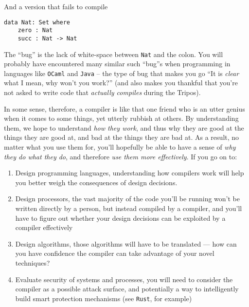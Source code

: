 And   a version that fails to compile 

\begin{code}
\label{code:agda-nat-bad}
\begin{verbatim}
data Nat: Set where
    zero : Nat
    succ : Nat -> Nat
\end{verbatim}
\end{code}

The ``bug'' is the lack of white-space between \texttt{Nat} and the colon. You will probably have encountered many similar such ``bug''s when programming in languages like \texttt{OCaml} and \texttt{Java} -- the type of bug that makes you go ``It is \emph{clear} what I mean, why won't you work?'' (and also makes you thankful that you're not asked to write code that \emph{actually compiles} during the Tripos).

In some sense, therefore, a compiler is like that one friend who is an utter genius when it comes to some things, yet utterly rubbish at others. By understanding them, we hope to understand \emph{how they work}, and thus why they are good at the things they are good at, and bad at the things they are bad at. As a result, no matter what you use them for, you'll hopefully be able to have a sense of \emph{why they do what they do}, and therefore \emph{use them more effectively}. If you go on to:

\begin{enumerate}
    \item Design programming languages, understanding how compilers work will help you better weigh the consequences of design decisions. 
    \item Design processors, the vast majority of the code you'll be running won't be written directly by a person, but instead compiled by a compiler, and you'll have to figure out whether your design decisions can be exploited by a compiler effectively
    \item Design algorithms, those algorithms will have to be translated --- how can you have confidence the compiler can take advantage of your novel techniques?
    \item Evaluate security of systems and processes, you will need to consider the compiler as a possible attack surface, and potentially a way to intelligently build smart protection mechanisms (see \texttt{Rust}, for example)
\end{enumerate}

